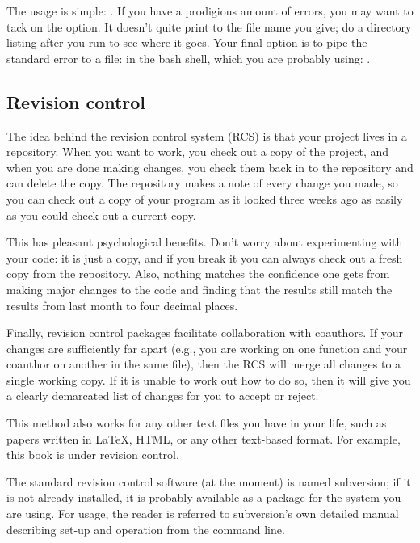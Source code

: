 The usage is simple: . If you have a prodigious amount
of errors, you may want to tack on the  option. It doesn't
quite print to the file name you give; do a directory listing after you run  to see where it goes.  Your final option is to pipe the standard
error to a file: in the bash shell, which you are probably using: .

\subsection{Revision control}  \label{valgrind}
The idea behind the revision control system (RCS) is that your project
lives in a repository. When you want to work, you check out
a copy of the project, and when you are done making changes, you check
them back in to the repository and can delete the copy.  The repository
makes a note of every change you made, so you can check out a copy of
your program as it looked three weeks ago as easily as you could check
out a current copy.

This has pleasant psychological benefits. Don't worry about experimenting
with your code: it is just a copy, and if you break it you can always check
out a fresh copy from the repository. Also, nothing matches the confidence
one gets from making major changes to the code and finding that the
results still match the results from last month to four decimal places.

Finally, revision control packages facilitate collaboration with
coauthors. If your changes are sufficiently far apart (e.g., you are
working on one function and your coauthor on another in the same file),
then the RCS will merge all changes to a single working copy. If
it is unable to work out how to do so, then it will give you a
clearly demarcated list of changes for you to accept or reject.

This method also works for any other text files you have in your
life, such as papers written in \LaTeX, HTML, or any other text-based
format. For example, this book is under revision control.

The standard revision control software (at the moment) is named
subversion; if it is not already installed, it is probably available as
a package for the system you are using. For usage, the reader is referred
to subversion's own detailed manual describing set-up and operation from
the command line.

